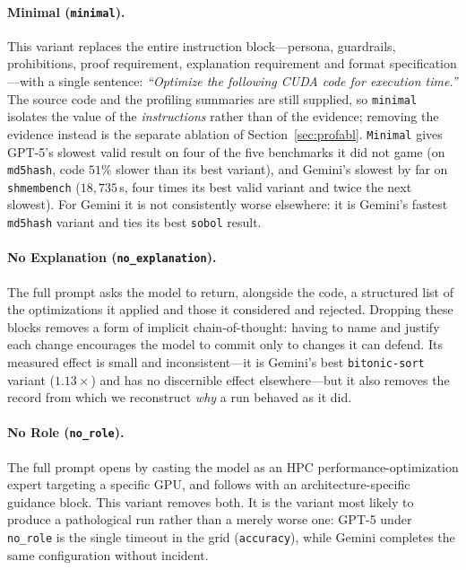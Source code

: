 \paragraph{Minimal (\texttt{minimal}).}
This variant replaces the entire instruction block---persona, guardrails, prohibitions, proof
requirement, explanation requirement and format specification---with a single sentence:
\textit{``Optimize the following CUDA code for execution time.''} The source code and the profiling
summaries are still supplied, so \texttt{minimal} isolates the value of the \emph{instructions} rather
than of the evidence; removing the evidence instead is the separate ablation of
Section~\ref{sec:profabl}.
\texttt{Minimal} gives GPT-5's slowest valid result on four of the five benchmarks it did not game
(on \texttt{md5hash}, code $51\%$ slower than its best variant), and Gemini's slowest by far on
\texttt{shmembench} ($18{,}735$\,\textmu s, four times its best valid variant and twice the next
slowest). For Gemini it is not consistently worse elsewhere: it is Gemini's fastest \texttt{md5hash}
variant and ties its best \texttt{sobol} result.

\paragraph{No Explanation (\texttt{no\_explanation}).}
The full prompt asks the model to return, alongside the code, a structured list of the optimizations it
applied and those it considered and rejected. Dropping these blocks removes a form of implicit
chain-of-thought: having to name and justify each change encourages the model to commit only to changes
it can defend. Its measured effect is small and inconsistent---it is Gemini's best
\texttt{bitonic-sort} variant ($1.13\times$) and has no discernible effect elsewhere---but it also
removes the record from which we reconstruct \emph{why} a run behaved as it did.

\paragraph{No Role (\texttt{no\_role}).}
The full prompt opens by casting the model as an HPC performance-optimization expert targeting a
specific GPU, and follows with an architecture-specific guidance block. This variant removes both.
It is the variant most likely to produce a pathological run rather than a merely worse one: GPT-5 under
\texttt{no\_role} is the single timeout in the grid (\texttt{accuracy}), while Gemini completes the same
configuration without incident.

